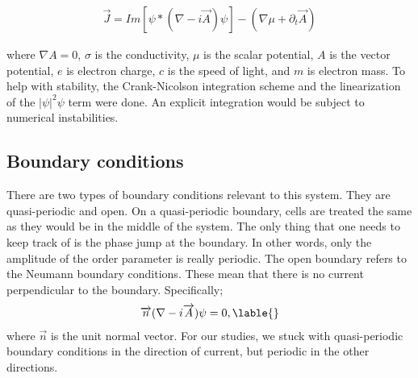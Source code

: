 \begin{eqnarray}
\overrightarrow J = Im[\psi* (\nabla - i \overrightarrow A)\psi] - (\nabla \mu + \partial_t \overrightarrow A)
\label{currentEq}
\end{eqnarray}


where $\nabla A = 0$, $\sigma$ is the conductivity, $\mu$ is the scalar potential, $A$ is the vector potential, $e$ is electron charge, $c$ is the speed of light, and $m$ is electron mass. To help with stability, the Crank-Nicolson integration scheme and the linearization of the $|\psi|^2\psi$ term were done. An explicit integration would be subject to numerical instabilities.

\subsection{Boundary conditions}

There are two types of boundary conditions relevant to this system. They are quasi-periodic and open. On a quasi-periodic boundary, cells are treated the same as they would be in the middle of the system. The only thing that one needs to keep track of is the phase jump at the boundary. In other words, only the amplitude of the order parameter is really periodic. The open boundary refers to the Neumann boundary conditions. These mean that there is no current perpendicular to the boundary. Specifically;
\begin{eqnarray}
\overrightarrow n (\nabla - i \overrightarrow A)\psi = 0 ,
\lable{}
\end{eqnarray}
where $\overrightarrow n$ is the unit normal vector. For our studies, we stuck with quasi-periodic boundary conditions in the direction of current, but periodic in the other directions.



